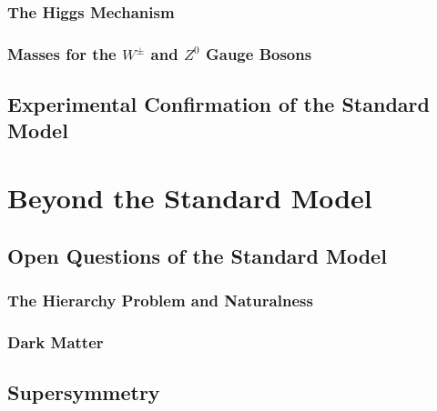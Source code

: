 \documentclass[10pt,twoside,cucitura,classica,english,openany]{toptesi}
\begin{document}


\subsection{The Higgs Mechanism}
\label{sec:higgs-model}



\subsection{Masses for the $W^{\pm}$ and $Z^{0}$ Gauge Bosons}
\label{sec:masses-wpm-z}



\section{Experimental Confirmation of the Standard Model}
\label{sec:exper-conf-stand}



\chapter{Beyond the Standard Model}
\label{cha:beyond-stand-model}

\section{Open Questions of the Standard Model}
\label{sec:open-quest-stand}



\subsection{The Hierarchy Problem and Naturalness}
\label{sec:hier-probl-natur}



\subsection{Dark Matter}
\label{sec:dark-matter}



\section{Supersymmetry}
\label{sec:supersymmetry}
\end{document}
